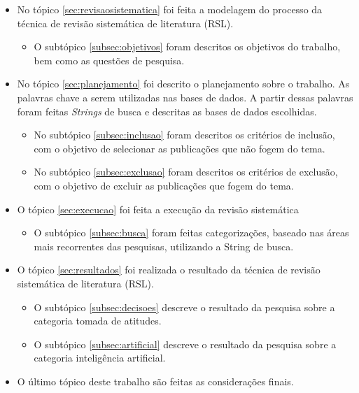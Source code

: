 \begin{itemize}
	\item No tópico \ref{sec:revisaosistematica} foi feita a modelagem do processo da técnica de revisão sistemática de literatura (RSL).
		\begin{itemize}
		\item O subtópico \ref{subsec:objetivos} foram descritos os objetivos do trabalho, bem como as questões de pesquisa.
		\end{itemize}
	\item No tópico \ref{sec:planejamento} foi descrito o planejamento sobre o trabalho. As palavras chave a serem utilizadas nas bases de dados. A partir dessas palavras foram feitas \textit{Strings} de busca e descritas as bases de dados escolhidas.
		\begin{itemize}
		\item No subtópico \ref{subsec:inclusao} foram descritos os critérios de inclusão, com o objetivo de selecionar as publicações que não fogem do tema.
		\item No subtópico \ref{subsec:exclusao} foram descritos os critérios de exclusão, com o objetivo de excluir as publicações que fogem do tema.
		\end{itemize}
	\item O tópico \ref{sec:execucao} foi feita a execução da revisão sistemática
		\begin{itemize}
		\item O subtópico \ref{subsec:busca} foram feitas categorizações, baseado nas áreas mais recorrentes das pesquisas, utilizando a String de busca.
		\end{itemize}
	\item O tópico \ref{sec:resultados} foi realizada o resultado da técnica de revisão sistemática de literatura (RSL).
		\begin{itemize}
		\item O subtópico \ref{subsec:decisoes} descreve o resultado da pesquisa sobre a categoria tomada de atitudes.
		\item O subtópico \ref{subsec:artificial} descreve o resultado da pesquisa sobre a categoria inteligência artificial.
		\end{itemize}
		\item O último tópico deste trabalho são feitas as considerações finais.
\end{itemize}